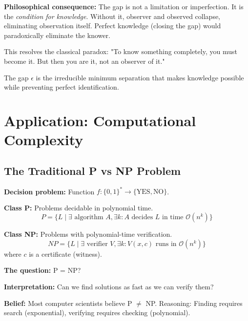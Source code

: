 \documentclass[twocolumn,10pt]{article}
\theoremstyle{definition}
\theoremstyle{remark}
\newcommand{\bigO}{\mathcal{O}}
\begin{document}
\vspace{0.2cm}
\noindent\textbf{Philosophical consequence:} The gap is not a limitation or imperfection. It is the \textit{condition for knowledge}. Without it, observer and observed collapse, eliminating observation itself. Perfect knowledge (closing the gap) would paradoxically eliminate the knower.

This resolves the classical paradox: "To know something completely, you must become it. But then you are it, not an observer of it."

The gap $\epsilon$ is the irreducible minimum separation that makes knowledge possible while preventing perfect identification.

\section{Application: Computational Complexity}
\label{sec:complexity}

\subsection{The Traditional P vs NP Problem}

\textbf{Decision problem:} Function $f: \{0,1\}^* \to \{\text{YES}, \text{NO}\}$.

\vspace{0.2cm}
\noindent\textbf{Class P\cite{cobham1965}:} Problems decidable in polynomial time.
\begin{equation}
P = \{L \mid \exists \text{ algorithm } A, \exists k: A \text{ decides } L \text{ in time } \bigO(n^k)\}
\end{equation}

\textbf{Class NP\cite{cook1971}:} Problems with polynomial-time verification.
\begin{equation}
NP = \{L \mid \exists \text{ verifier } V, \exists k: V(x, c) \text{ runs in } \bigO(n^k)\}
\end{equation}
where $c$ is a certificate (witness).

\vspace{0.2cm}
\noindent\textbf{The question:} P = NP?

\textbf{Interpretation:} Can we find solutions as fast as we can verify them?

\vspace{0.2cm}
\noindent\textbf{Belief:} Most computer scientists believe P $\neq$ NP\cite{gasarch2002}. Reasoning: Finding requires search (exponential), verifying requires checking (polynomial).
\end{document}
